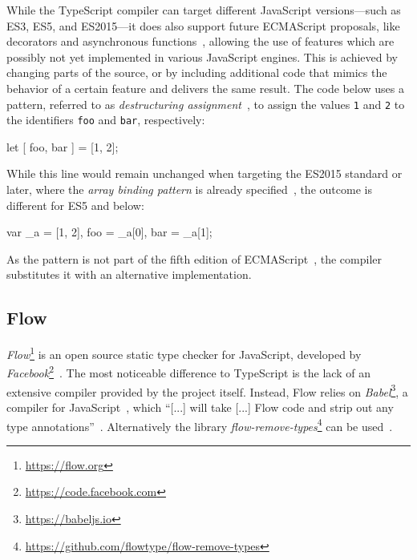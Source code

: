 While the TypeScript compiler can target different JavaScript versions---such as ES3, ES5, and ES2015---it does also support future ECMAScript proposals, like decorators and asynchronous functions~\cites{TypeScriptHandbook:CompilerOptions, TypeScriptWebsite}, allowing the use of features which are possibly not yet implemented in various JavaScript engines. This is achieved by changing parts of the source, or by including additional code that mimics the behavior of a certain feature and delivers the same result. The code below uses a pattern, referred to as \emph{destructuring assignment}~\cite{DestructuringAssignment:Mozilla:2015}, to assign the values \texttt{1} and \texttt{2} to the identifiers \texttt{foo} and \texttt{bar}, respectively:
\begin{JsCode}[numbers=none]
let [ foo, bar ] = [1, 2];  
\end{JsCode}
While this line would remain unchanged when targeting the ES2015 standard or later, where the \emph{array binding pattern} is already specified~\cite[p.~198]{ES6Spec:Ecma:2015}, the outcome is different for ES5 and below:
\begin{JsCode}[numbers=none]
var _a = [1, 2], foo = _a[0], bar = _a[1];
\end{JsCode}
As the pattern is not part of the fifth edition of ECMAScript~\cite{ES5Spec:Ecma:2015}, the compiler substitutes it with an alternative implementation.
 
\subsection{Flow}
\label{sec:flow}

\emph{Flow}\footnote{\url{https://flow.org}} is an open source static type checker for JavaScript, developed by \emph{Facebook}\footnote{\url{https://code.facebook.com}}~\cite{FacebookCode:Flow}. The most noticeable difference to TypeScript is the lack of an extensive compiler provided by the project itself. Instead, Flow relies on \emph{Babel}\footnote{\url{https://babeljs.io}}, a compiler for JavaScript~\cite{BabelWebsite}, which ``[...] will take [...] Flow code and strip out any type annotations''~\cite{FlowDocs:Install}. Alternatively the library \emph{flow-remove-types}\footnote{\url{https://github.com/flowtype/flow-remove-types}} can be used~\cite{FlowDocs:Install}.

